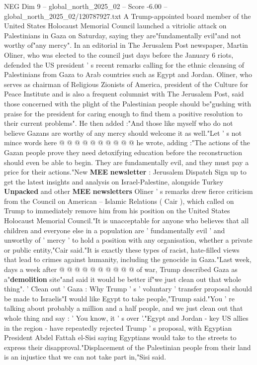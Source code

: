 \begin{textsample}{NEG Dim 9 – global\_north\_2025\_02 – Score -6.00 – global\_north\_2025\_02/120787927.txt}  \label{ex:f9_neg_017}
A Trump-appointed board member of the United States Holocaust Memorial Council launched a vitriolic attack on Palestinians in Gaza on Saturday, saying they are"fundamentally evil"and not worthy of"any mercy".
In an editorial in The Jerusalem Post newspaper, Martin Oliner, who was elected to the council just days before the January 6 riots, defended the US president ' s recent remarks calling for the ethnic cleansing of Palestinians from Gaza to Arab countries such as Egypt and Jordan.
Oliner, who serves as chairman of Religious Zionists of America, president of the Culture for Peace Institute and is also a frequent columnist with The Jerusalem Post, said those concerned with the plight of the Palestinian people should be"gushing with praise for the president for caring enough to find them a positive resolution to their current problems".
He then added :"And those like myself who do not believe Gazans are worthy of any mercy should welcome it as well."Let ' s not mince words here @ @ @ @ @ @ @ @ @ @ he wrote, adding :"The actions of the Gazan people prove they need detoxifying education before the reconstruction should even be able to begin.
They are fundamentally evil, and they must pay a price for their actions."New \textbf{MEE} \textbf{newsletter} : Jerusalem Dispatch Sign up to get the latest insights and analysis on Israel-Palestine, alongside Turkey \textbf{Unpacked} and other \textbf{MEE} \textbf{newsletters} Oliner ' s remarks drew fierce criticism from the Council on American -- Islamic Relations ( Cair ), which called on Trump to immediately remove him from his position on the United States Holocaust Memorial Council."It is unacceptable for anyone who believes that all children and everyone else in a population are ' fundamentally evil ' and unworthy of ' mercy ' to hold a position with any organisation, whether a private or public entity,"Cair said."It is exactly these types of racist, hate-filled views that lead to crimes against humanity, including the genocide in Gaza."Last week, days a week after @ @ @ @ @ @ @ @ @ @ of war, Trump described Gaza as a"\textbf{demolition} site"and said it would be better if"we just clean out that whole thing". ' Clean out ' Gaza : Why Trump ' s ' voluntary ' transfer proposal should be made to Israelis"I would like Egypt to take people,"Trump said."You ' re talking about probably a million and a half people, and we just clean out that whole thing and say : ' You know, it ' s over '."Egypt and Jordan - key US allies in the region - have repeatedly rejected Trump ' s proposal, with Egyptian President Abdel Fattah el-Sisi saying Egyptians would take to the streets to express their disapproval."Displacement of the Palestinian people from their land is an injustice that we can not take part in,"Sisi said.

\end{textsample}
